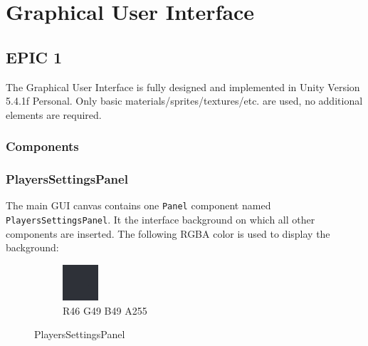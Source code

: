\section{Graphical User Interface}
\subsection{EPIC 1}
\noindent The Graphical User Interface is fully designed and implemented in Unity Version 5.4.1f Personal. Only basic materials/sprites/textures/etc. are used, no additional elements are required.

\subsubsection{Components}
\subsubsection*{PlayersSettingsPanel}\label{gui-playerssettingspanel}
\indent The main GUI canvas contains one \verb+Panel+ component named \verb+PlayersSettingsPanel+. It the interface background on which all other components are inserted. The following RGBA color is used to display the background: \\
\begin{figure}[h]
\centering
\begin{subfigure}{\textwidth}
\centering
\includegraphics[]{playerssettingspanel-color}
\caption*{R46 G49 B49 A255}
\end{subfigure}
\caption{PlayersSettingsPanel}
\end{figure}

